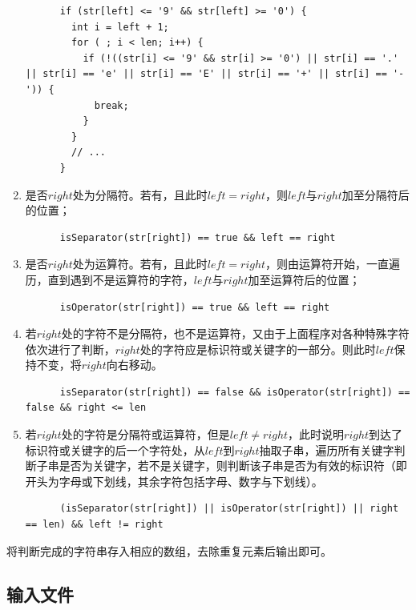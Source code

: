\documentclass[11pt]{homework}
\begin{document}
\begin{enumerate}
    \lstset{language=c++}
    \begin{lstlisting}
      if (str[left] <= '9' && str[left] >= '0') {
        int i = left + 1;
        for ( ; i < len; i++) {
          if (!((str[i] <= '9' && str[i] >= '0') || str[i] == '.' || str[i] == 'e' || str[i] == 'E' || str[i] == '+' || str[i] == '-')) {
            break;
          }
        }
        // ...
      }
    \end{lstlisting}
    \item 是否$right$处为分隔符。若有，且此时$left = right$，则$left$与$right$加至分隔符后的位置；
    \lstset{language=c++}
    \begin{lstlisting}
      isSeparator(str[right]) == true && left == right
    \end{lstlisting}
    \item 是否$right$处为运算符。若有，且此时$left = right$，则由运算符开始，一直遍历，直到遇到不是运算符的字符，$left$与$right$加至运算符后的位置；
    \lstset{language=c++}
    \begin{lstlisting}
      isOperator(str[right]) == true && left == right
    \end{lstlisting}
    \item 若$right$处的字符不是分隔符，也不是运算符，又由于上面程序对各种特殊字符依次进行了判断，$right$处的字符应是标识符或关键字的一部分。则此时$left$保持不变，将$right$向右移动。
    \lstset{language=c++}
    \begin{lstlisting}
      isSeparator(str[right]) == false && isOperator(str[right]) == false && right <= len
    \end{lstlisting}
    \item 若$right$处的字符是分隔符或运算符，但是$left \neq right$，此时说明$right$到达了标识符或关键字的后一个字符处，从$left$到$right$抽取子串，遍历所有关键字判断子串是否为关键字，若不是关键字，则判断该子串是否为有效的标识符（即开头为字母或下划线，其余字符包括字母、数字与下划线）。
    \lstset{language=c++}
    \begin{lstlisting}
      (isSeparator(str[right]) || isOperator(str[right]) || right == len) && left != right
    \end{lstlisting}
  \end{enumerate}

  将判断完成的字符串存入相应的数组，去除重复元素后输出即可。


\subsection*{输入文件}
\end{document}
